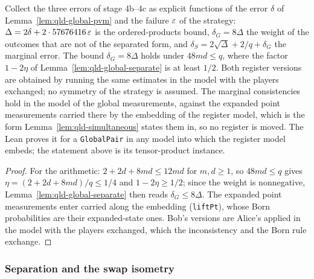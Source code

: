 \begin{lemma}
\label{lem:qld-global-robustness}
\leanok
Collect the three errors of stage 4b--4c as explicit functions of the error $\delta$ of
Lemma~\ref{lem:qld-global-pvm} and the failure $\varepsilon$ of the strategy:
$\Delta = 2\delta + 2 \cdot 57676416\,\varepsilon$ is the ordered-products bound,
$\delta_G = 8\Delta$ the weight of the outcomes that are not of the separated form, and
$\delta_S = 2\sqrt{\Delta} + 2/q + \delta_G$ the marginal error. The bound
$\delta_G = 8\Delta$ holds under $48md \leq q$, where the factor $1 - 2\eta$ of
Lemma~\ref{lem:qld-global-separate} is at least $1/2$. Both register versions are obtained by
running the same estimates in the model with the players exchanged; no symmetry of the strategy is
assumed. The marginal consistencies hold in the model of the global measurements, against the
expanded point measurements carried there by the embedding of the register model, which is the
form Lemma~\ref{lem:qld-simultaneous} states them in, so no register is moved. The Lean proves it
for a \texttt{GlobalPair} in any model into which the register model embeds; the statement above
is its tensor-product instance.
\end{lemma}

\begin{proof}
\leanok
For the arithmetic: $2 + 2d + 8md \leq 12md$ for $m, d \geq 1$, so $48md \leq q$ gives
$\eta = (2 + 2d + 8md)/q \leq 1/4$ and $1 - 2\eta \geq 1/2$; since the weight is nonnegative,
Lemma~\ref{lem:qld-global-separate} then reads $\delta_G \leq 8\Delta$. The expanded point
measurements enter carried along the embedding (\texttt{liftPt}), whose Born probabilities are
their expanded-state ones. Bob's versions are Alice's applied in the model with the players
exchanged, which the inconsistency and the Born rule exchange.
\end{proof}

\subsubsection{Separation and the swap isometry}

